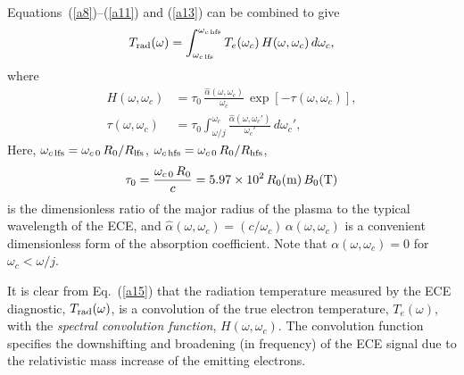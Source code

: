 \documentclass{iopjournal}
\begin{document}
{Equations~(\ref{a8})--(\ref{a11}) and (\ref{a13}) can be combined to give
\begin{equation}\label{a15}
T_{\rm rad}(\omega) = \int_{\omega_{c\,{\rm lfs}}}^{\omega_{c\,{\rm hfs}}}T_e(\omega_c)\,H(\omega,\omega_c)\,d\omega_c,
\end{equation}
where
\begin{align}
H(\omega,\omega_c)&=\tau_0\,\frac{\hat{\alpha}(\omega,\omega_c)}{\omega_c}\,\exp\left[-\tau(\omega,\omega_c)\right],\\[0.5ex]
\tau(\omega,\omega_c)&= \tau_0\int_{\omega/j}^{\omega_c}\frac{\hat{\alpha}(\omega,\omega_c')}{\omega_c'}\,d\omega_c',
\end{align}
Here, $\omega_{c\,{\rm lfs}}= \omega_{c\,0}\,R_0/R_{\rm lfs}$,  $\omega_{c\,{\rm hfs}}= \omega_{c\,0}\,R_0/R_{\rm hfs}$, 
\begin{equation}
\tau_0 = \frac{\omega_{c\,0}\,R_0}{c}= 5.97\times 10^2\,R_0({\rm m})\,B_0({\rm T})
\end{equation}
is the dimensionless  ratio of the major radius of the plasma to the typical wavelength of the ECE, and $\hat{\alpha}(\omega,\omega_c) = (c/\omega_c)\,\alpha(\omega,\omega_c)$
is a convenient dimensionless form of the absorption coefficient. Note that $\alpha(\omega,\omega_c)=0$ for $\omega_c<\omega/j$.  

 It is clear from Eq.~(\ref{a15}) that the radiation temperature measured by the ECE diagnostic, $T_{\rm rad}(\omega)$,  is a convolution of the true
electron temperature, $T_e(\omega)$,  with the {\em spectral convolution function}, $H(\omega,\omega_c)$. The convolution function specifies the downshifting and broadening   (in frequency) of the ECE
signal due to the relativistic mass increase of the emitting electrons.

}
\end{document}
